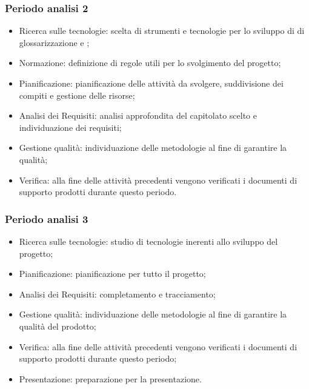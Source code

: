        \subsubsection{Periodo analisi 2}
            \begin{itemize}
                \item Ricerca sulle tecnologie: scelta di strumenti e tecnologie per lo sviluppo di  di glossarizzazione e ;
                \item Normazione: definizione di regole utili per lo svolgimento del progetto; 
                \item Pianificazione: pianificazione delle attività da svolgere, suddivisione dei compiti e gestione delle risorse;
                \item Analisi dei Requisiti: analisi approfondita del capitolato scelto e individuazione dei requisiti;
                \item Gestione qualità: individuazione delle metodologie al fine di garantire la qualità;
                \item Verifica: alla fine delle attività precedenti vengono verificati i documenti di supporto prodotti durante questo periodo.
            \end{itemize}

        \subsubsection{Periodo analisi 3}
            \begin{itemize}
                \item Ricerca sulle tecnologie: studio di tecnologie inerenti allo sviluppo del progetto;
                \item Pianificazione: pianificazione per tutto il progetto;
                \item Analisi dei Requisiti: completamento  e tracciamento;
                \item Gestione qualità: individuazione delle metodologie al fine di garantire la qualità del prodotto;
                \item Verifica: alla fine delle attività precedenti vengono verificati i documenti di supporto prodotti durante questo periodo;
                \item Presentazione: preparazione per la presentazione.
            \end{itemize}
            
